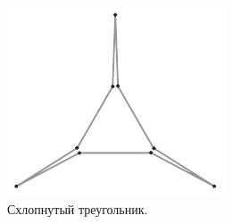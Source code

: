 \begin{figure}[htb!]
\centering
\includegraphics[scale=.95]{pics/treug}
\caption{Схлопнутый треугольник.}
\label{pic:treug}
\end{figure}

